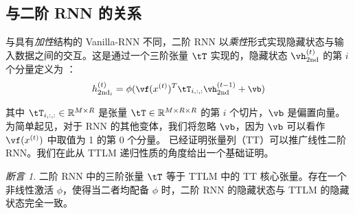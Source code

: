 \documentclass{article}
\theoremstyle{plain}
\theoremstyle{definition}
\theoremstyle{remark}
\newtheorem{claim}[theorem]{断言}
\begin{document}
\subsection{与二阶 RNN 的关系}
\label{appendix: seecond}

与具有\textit{加性}结构的 Vanilla-RNN \citep{mikolov2012context} 不同，二阶 RNN 以\textit{乘性}形式实现隐藏状态与输入数据之间的交互。这是通过一个三阶张量 $\tT$ 实现的，隐藏状态 $\vh^{(t)}_\textrm{2nd}$ 的第 $i$ 个分量定义为 \citep{hochreiter1997long, maupome-meurs-2020-language}：
%
\begin{equation} \small
\label{eq: second-order-rnn}
h^{(t)}_{\textrm{2nd}_i}  = \phi(\vf(x^{(t)})^T \tT_{i, :, :}\vh^{(t-1)}_\textrm{2nd} + \vb)
\end{equation}
%

其中 $\tT_{i, :, :} \in\mathbb{R}^{M \times R}$ 是张量 $\tT\in\mathbb{R}^{M\times R \times R}$ 的第 $i$ 个切片，$\vb$ 是偏置向量。为简单起见，对于 RNN 的其他变体，我们将忽略 $\vb$，因为 $\vb$ 可以看作 $\vf (x^{(t)})$ 中取值为 1 的第 $0$ 个分量。\cite{rabusseau2019connecting} 已经证明张量列（TT）可以推广线性二阶 RNN。我们在此从 TTLM 递归性质的角度给出一个基础证明。

\begin{claim}
\label{cm: G and T}
二阶 RNN 中的三阶张量 $\tT$ 等于 TTLM 中的 TT 核心张量。存在一个非线性激活 $\phi$，使得当二者均配备 $\phi$ 时，二阶 RNN 的隐藏状态与 TTLM 的隐藏状态完全一致。
\end{claim}
\end{document}
